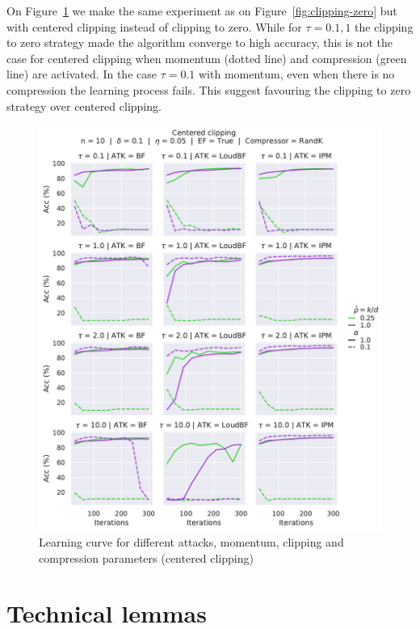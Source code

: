 \documentclass{article}
\begin{document}
On Figure~\ref{fig:clipping-centered} we make the same experiment as on Figure~\ref{fig:clipping-zero} but with centered clipping instead of clipping to zero. While for $\tau = 0.1, 1$ the clipping to zero strategy made the algorithm converge to high accuracy, this is not the case for centered clipping when momentum (dotted line) and compression (green line) are activated. In the case $\tau=0.1$ with momentum, even when there is no compression the learning process fails. This suggest favouring the clipping to zero strategy over centered clipping.

\begin{figure}[h]
\centering
\includegraphics[scale=0.63]{figures/EXP_Clipping_Centered}
\caption{Learning curve for different attacks, momentum, clipping and compression parameters (centered clipping)}\label{fig:clipping-centered}
\end{figure}


\section{Technical lemmas}\label{app:technical-lemmas}
\end{document}
